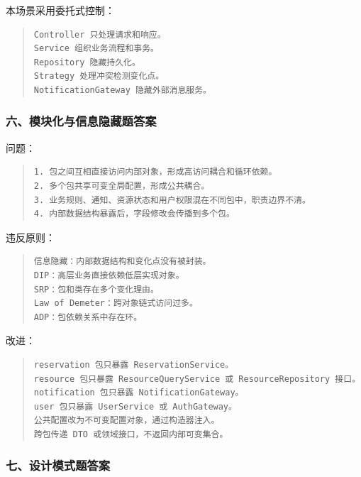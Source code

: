 \documentclass[UTF8,zihao=-4]{ctexart}
\begin{document}
本场景采用委托式控制：


\begin{quote}
\footnotesize
\begin{verbatim}
Controller 只处理请求和响应。
Service 组织业务流程和事务。
Repository 隐藏持久化。
Strategy 处理冲突检测变化点。
NotificationGateway 隐藏外部消息服务。
\end{verbatim}
\end{quote}


\subsubsection*{六、模块化与信息隐藏题答案}


问题：


\begin{quote}
\footnotesize
\begin{verbatim}
1. 包之间互相直接访问内部对象，形成高访问耦合和循环依赖。
2. 多个包共享可变全局配置，形成公共耦合。
3. 业务规则、通知、资源状态和用户权限混在不同包中，职责边界不清。
4. 内部数据结构暴露后，字段修改会传播到多个包。
\end{verbatim}
\end{quote}


违反原则：


\begin{quote}
\footnotesize
\begin{verbatim}
信息隐藏：内部数据结构和变化点没有被封装。
DIP：高层业务直接依赖低层实现对象。
SRP：包和类存在多个变化理由。
Law of Demeter：跨对象链式访问过多。
ADP：包依赖关系中存在环。
\end{verbatim}
\end{quote}


改进：


\begin{quote}
\footnotesize
\begin{verbatim}
reservation 包只暴露 ReservationService。
resource 包只暴露 ResourceQueryService 或 ResourceRepository 接口。
notification 包只暴露 NotificationGateway。
user 包只暴露 UserService 或 AuthGateway。
公共配置改为不可变配置对象，通过构造器注入。
跨包传递 DTO 或领域接口，不返回内部可变集合。
\end{verbatim}
\end{quote}


\subsubsection*{七、设计模式题答案}
\end{document}

